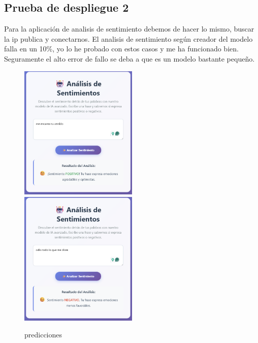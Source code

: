 \documentclass{article}
\begin{document}
	\subsection{Prueba de despliegue 2}

	Para la aplicación de analisis de sentimiento debemos de hacer lo mismo, buscar la ip publica y conectarnos. El analisis de sentimiento según creador del modelo falla en un 10\%, yo lo he probado con estos casos y me ha funcionado bien. Seguramente el alto error de fallo se deba a que es un modelo bastante pequeño.

	\begin{figure}[H]

	\includegraphics[width=0.5\textwidth]{prueba2.png}
	\includegraphics[width=0.5\textwidth]{prueba3.png}
	\caption{predicciones}
	\end{figure}
\end{document}
